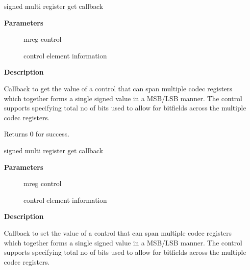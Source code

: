 \documentclass[a4paper,8pt,english]{sphinxmanual}
\begin{document}
\begin{fulllineitems}
\label{sound/kernel-api/alsa-driver-api:c.snd_soc_get_xr_sx}
signed multi register get callback

\end{fulllineitems}


\textbf{Parameters}
\begin{description}
\item[{}] \leavevmode
mreg control

\item[{}] \leavevmode
control element information

\end{description}

\textbf{Description}

Callback to get the value of a control that can span
multiple codec registers which together forms a single
signed value in a MSB/LSB manner. The control supports
specifying total no of bits used to allow for bitfields
across the multiple codec registers.

Returns 0 for success.

\begin{fulllineitems}
\label{sound/kernel-api/alsa-driver-api:c.snd_soc_put_xr_sx}
signed multi register get callback

\end{fulllineitems}


\textbf{Parameters}
\begin{description}
\item[{}] \leavevmode
mreg control

\item[{}] \leavevmode
control element information

\end{description}

\textbf{Description}

Callback to set the value of a control that can span
multiple codec registers which together forms a single
signed value in a MSB/LSB manner. The control supports
specifying total no of bits used to allow for bitfields
across the multiple codec registers.
\end{document}
